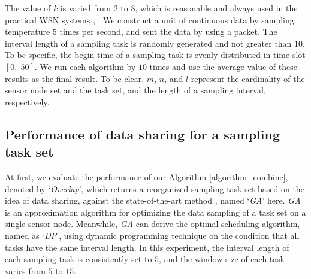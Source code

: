 \documentclass[prodmode,acmtosn]{acmsmall}
\begin{document}
The value of $k$ is varied from $2$ to $8$, which is reasonable and always used in the practical WSN systems \cite{2013_TPDS_coverage}, \cite{2005_coverage_problem}. We construct a unit of continuous data by sampling temperature $5$ times per second, and sent the data by using a packet. The interval length of a sampling task is randomly generated and not greater than $10$. To be specific, the begin time of a sampling task is evenly distributed in time slot $[0,\;50]$. We  run each algorithm by $10$ times and use the average value of these results as the final result. To be clear, $m$, $n$, and $l$ represent the cardinality of the sensor node set and the task set, and the length of a sampling interval, respectively.


\subsection{Performance of data sharing for a sampling task set}

At first, we evaluate the performance of our Algorithm \ref{algorithm_combine}, denoted by `\textit{Overlap}', which returns a reorganized sampling task set based on the idea of data sharing, against the state-of-the-art method \cite{2013fang}, named `\textit{GA}' here. \emph{GA} is an approximation algorithm for optimizing the data sampling of a task set on a single sensor node. Meanwhile, \emph{GA} can derive the optimal scheduling algorithm, named as `\textit{DP}', using dynamic programming technique on the condition that all tasks have the same interval length. In this experiment, the interval length of each sampling task is consistently set to $5$, and the window size of each task varies from $5$ to $15$.
\end{document}
